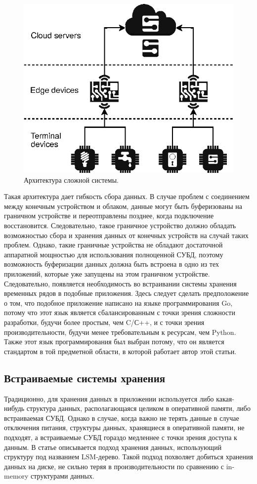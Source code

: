 \begin{figure}[htb]
\centering
\includegraphics{figures/iot-hierarchy.drawio.eps}
\caption{Архитектура сложной системы.} \label{fig1}
\end{figure}

Такая архитектура дает гибкость сбора данных.
В случае проблем с соединением между конечным устройством и облаком, данные могут быть буферизованы на граничном устройстве и переотправлены позднее, когда подключение восстановится. Следовательно, такое граничное устройство должно обладать возможностью сбора и хранения данных от конечных устройств на случай таких проблем. Однако, такие граничные устройства не обладают достаточной аппаратной мощностью для использования полноценной СУБД, поэтому возможность буферизации данных должна быть встроена в одно из тех приложений, которые уже запущены на этом граничном устройстве. Следовательно, появляется необходимость во встраивании системы хранения временных рядов в подобные приложения. Здесь следует сделать предположение о том, что подобное приложение написано на языке программирования Go, потому что этот язык является сбалансированным с точки зрения сложности разработки, будучи более простым, чем C/С++, и с точки зрения производительности, будучи менее требовательным к ресурсам, чем Python. Также этот язык программирования был выбран потому, что он является стандартом в той предметной области, в которой работает автор этой статьи.

\subsection{Встраиваемые системы хранения}

Традиционно, для хранения данных в приложении используется либо какая-нибудь структура данных, располагающаяся целиком в оперативной памяти, либо встраиваемая СУБД. Однако в случае, когда важно не терять данные в случае отключения питания, структуры данных, хранящиеся в оперативной памяти, не подходят, а встраиваемые СУБД гораздо медленнее с точки зрения доступа к данным. В статье описывается подход хранения данных, использующий структуру под названием LSM-дерево. Такой подход похволяет добиться хранения данных на диске, не сильно теряя в производительности по сравнению с in-memory структурами данных.